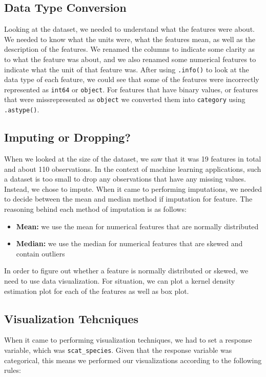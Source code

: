 \documentclass[a4paper]{article}
\begin{document}
\subsection{Data Type Conversion}
Looking at the dataset, we needed to understand what the features were about. We needed to know what the units were, what the features mean, as well as the 
description of the features. We renamed the columns to indicate some clarity as to what the feature was about, and we also renamed some numerical features
to indicate what the unit of that feature was. After using \texttt{.info()} to look at the data type of each feature, we could see that some of the features
were incorrectly represented as \texttt{int64} or \texttt{object}. For features that have binary values, or features that were missrepresented as 
\texttt{object} we converted them into \texttt{category} using \texttt{.astype()}.

\subsection{Imputing or Dropping?}
When we looked at the size of the dataset, we saw that it was 19 features in total and about 110 observations. In the context of machine learning 
applications, such a dataset is too small to drop any observations that have any missing values. Instead, we chose to impute. When it came to performing
imputations, we needed to decide between the mean and median method if imputation for feature. The reasoning behind each method of imputation is as follows:

\begin{itemize}
    \item \textbf{Mean:} we use the mean for numerical features that are normally distributed
    \item \textbf{Median:} we use the median for numerical features that are skewed and contain outliers
\end{itemize}

\noindent In order to figure out whether a feature is normally distributed or skewed, we need to use data visualization. For situation, we can plot a kernel
density estimation plot for each of the features as well as box plot.

\subsection{Visualization Tehcniques}
When it came to performing visualization techniques, we had to set a response variable, which was \texttt{scat\_species}. Given that the response variable
was categorical, this means we performed our visualizations according to the following rules:
\end{document}
